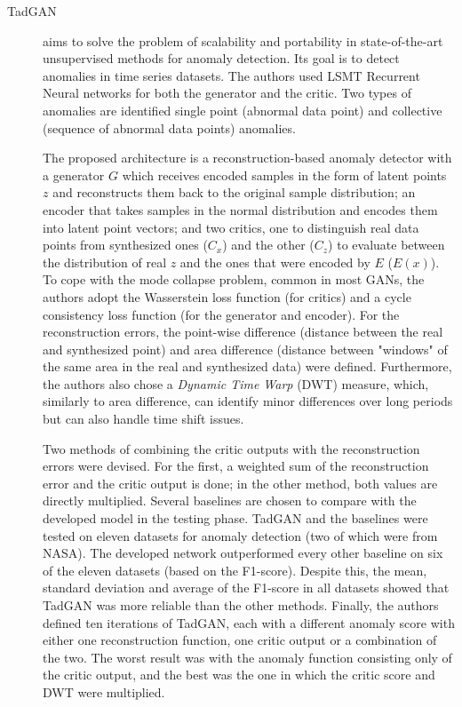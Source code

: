 \begin{description}
    \item[TadGAN \cite{geiger.etal_TadGANTimeSeries_2020}] aims to solve the problem of scalability and portability in state-of-the-art unsupervised methods for anomaly detection. Its goal is to detect anomalies in time series datasets. The authors used LSMT Recurrent Neural networks for both the generator and the critic. Two types of anomalies are identified single point (abnormal data point) and collective (sequence of abnormal data points) anomalies. 
    
    The proposed architecture is a reconstruction-based anomaly detector with a generator $G$ which receives encoded samples in the form of latent points $z$ and reconstructs them back to the original sample distribution; an encoder that takes samples in the normal distribution and encodes them into latent point vectors; and two critics, one to distinguish real data points from synthesized ones ($C_x$) and the other ($C_z$) to evaluate between the distribution of real $z$ and the ones that were encoded by $E$ ($E(x)$). To cope with the mode collapse problem, common in most GANs, the authors adopt the Wasserstein loss function (for critics) and a cycle consistency loss function (for the generator and encoder). For the reconstruction errors, the point-wise difference (distance between the real and synthesized point)  and area difference (distance between "windows" of the same area in the real and synthesized data) were defined. Furthermore, the authors also chose a \textit{Dynamic Time Warp} (DWT) measure, which, similarly to area difference, can identify minor differences over long periods but can also handle time shift issues. 
    
    Two methods of combining the critic outputs with the reconstruction errors were devised. For the first, a weighted sum of the reconstruction error and the critic output is done; in the other method, both values are directly multiplied. Several baselines are chosen to compare with the developed model in the testing phase. TadGAN and the baselines were tested on eleven datasets for anomaly detection (two of which were from NASA). The developed network outperformed every other baseline on six of the eleven datasets (based on the F1-score). Despite this, the mean, standard deviation and average of the F1-score in all datasets showed that TadGAN was more reliable than the other methods. Finally, the authors defined ten iterations of TadGAN, each with a different anomaly score with either one reconstruction function, one critic output or a combination of the two. The worst result was with the anomaly function consisting only of the critic output, and the best was the one in which the critic score and DWT were multiplied.
\end{description}


